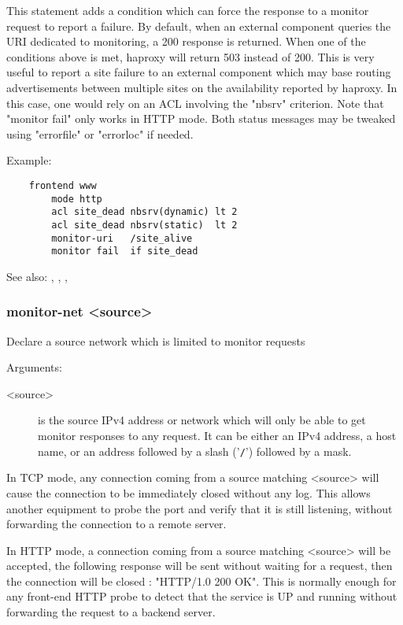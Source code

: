   This statement adds a condition which can force the response to a monitor
  request to report a failure. By default, when an external component queries
  the URI dedicated to monitoring, a 200 response is returned. When one of the
  conditions above is met, haproxy will return 503 instead of 200. This is
  very useful to report a site failure to an external component which may base
  routing advertisements between multiple sites on the availability reported by
  haproxy. In this case, one would rely on an ACL involving the "nbsrv"
  criterion. Note that "monitor fail" only works in HTTP mode. Both status
  messages may be tweaked using "errorfile" or "errorloc" if needed.

  Example:
 \begin{verbatim}
    frontend www
        mode http
        acl site_dead nbsrv(dynamic) lt 2
        acl site_dead nbsrv(static)  lt 2
        monitor-uri   /site_alive
        monitor fail  if site_dead
\end{verbatim}

  See also: , , , 

\subsubsection[monitor-net]{monitor-net <source>}
  Declare a source network which is limited to monitor requests


  Arguments:
\begin{description}
\item[ <source>]  is the source IPv4 address or network which will only be able to
              get monitor responses to any request. It can be either an IPv4
              address, a host name, or an address followed by a slash ('\verb|/|')
              followed by a mask.
\end{description}

  In TCP mode, any connection coming from a source matching <source> will cause
  the connection to be immediately closed without any log. This allows another
  equipment to probe the port and verify that it is still listening, without
  forwarding the connection to a remote server.

  In HTTP mode, a connection coming from a source matching <source> will be
  accepted, the following response will be sent without waiting for a request,
  then the connection will be closed : "HTTP/1.0 200 OK". This is normally
  enough for any front-end HTTP probe to detect that the service is UP and
  running without forwarding the request to a backend server.

